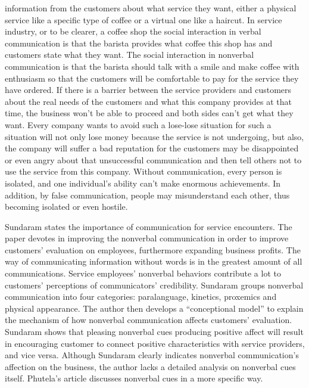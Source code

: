 \documentclass[12pt]{article}
\begin{document}
\begin{flushleft}
information from the customers about what service they want, either a physical
service like a specific type of coffee or a virtual one like a haircut.
In service industry, or to be clearer, a coffee shop the social interaction in
verbal communication is that the barista provides what coffee this shop has and
customers state what they want. The social interaction in nonverbal
communication is that the barista should talk with a smile and make
coffee with enthusiasm so that the customers will be comfortable to pay for the
service they have ordered.
If there is a barrier between the service providers and customers about the real
needs of the customers and what this company provides at that time, the
business won't be able to proceed and both sides can't get what they want. Every
company wants to avoid such a lose-lose situation for such a situation will not
only lose money because the service is not undergoing, but also, the company
will suffer a bad reputation for the customers may be disappointed or even angry
about that unsuccessful communication and then tell others not to use the
service from this company.
Without communication, every person is isolated, and one individual's ability
can't make enormous achievements. In addition, by false communication, people
may misunderstand each other, thus becoming isolated or even hostile.


Sundaram states the importance of communication for service encounters.
The paper devotes in improving the nonverbal communication in order to improve
customers' evaluation on employees, furthermore expanding business profits. 
The way of communicating information without words is in the greatest amount of all
communications. Service employees' nonverbal behaviors contribute a lot to
customers' perceptions of communicators' credibility. Sundaram groups nonverbal
communication into four categories: paralanguage, kinetics, proxemics and
physical appearance. The author then develops a ``conceptional model'' to
explain the mechanism of how nonverbal communication affects customers'
evaluation. Sundaram shows that pleasing nonverbal cues producing positive
affect will result in encouraging customer to connect positive characteristics
with service providers, and vice versa. Although Sundaram clearly indicates 
nonverbal communication's affection on the business, the author lacks a detailed
analysis on nonverbal cues itself. Phutela's article discusses nonverbal cues in
a more specific way.


\end{flushleft}
\end{document}
